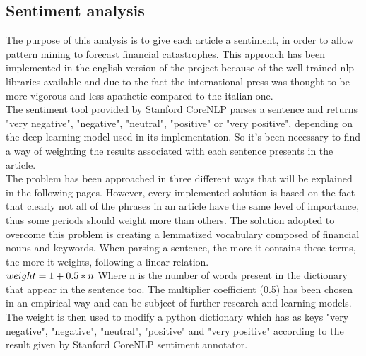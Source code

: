 \subsection{Sentiment analysis}
The purpose of this analysis is to give each article a sentiment, in order to allow pattern mining to forecast financial catastrophes. This approach has been implemented in the english version of the project because of the well-trained nlp libraries available and due to the fact the international press was thought to be more vigorous and less apathetic compared to the italian one. \\
The sentiment tool provided by Stanford CoreNLP parses a sentence and returns "very negative", "negative", "neutral", "positive" or "very positive", depending on the deep learning model \cite{sentimentdeep} used in its implementation. So it's been necessary to find a way of weighting the results associated with each sentence presents in the article. \\
The problem has been approached in three different ways that will be explained in the following pages.
However, every implemented solution is based on the fact that clearly not all of the phrases in an article have the same level of importance, thus some periods should weight more than others. The solution adopted to overcome this problem is creating a lemmatized vocabulary composed of financial nouns and keywords. When parsing a sentence, the more it contains these terms, the more it weights, following a linear relation. \\
\begin{math}
weight = 1 + 0.5*n \\
\end{math}
Where n is the number of words present in the dictionary that appear in the sentence too.
The multiplier coefficient (0.5) has been chosen in an empirical way and can be subject of further research and learning models. \\
The weight is then used to modify a python dictionary which has as keys "very negative", "negative", "neutral", "positive" and "very positive" according to the result given by Stanford CoreNLP sentiment annotator. 

